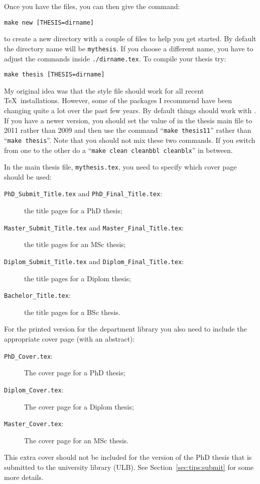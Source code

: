 \par\noindent
Once you have the files, you can then give the command:
\begin{verbatim}
make new [THESIS=dirname]
\end{verbatim}
to create a new directory with a couple of files to help you get
started. By default the directory name will be \texttt{mythesis}.
If you choose a different name, you have to adjust the 
commands inside \texttt{./dirname.tex}.
To compile your thesis try:
\begin{verbatim}
make thesis [THESIS=dirname]
\end{verbatim}

My original idea was that the style file should work for all recent
\TeX\ installations.  However, some of the packages I recommend have
been changing quite a lot over the past few years. By default things
should work with . If you
have a newer version, you should set the value of  in
the thesis main file to 2011 rather than
2009 and then use the command \enquote{\texttt{make thesis11}} rather
than \enquote{\texttt{make thesis}}. Note that you should not mix
these two commands. If you switch from one to the other do a
\enquote{\texttt{make clean cleanbbl cleanblx}} in between.

\noindent
In the main thesis file, \texttt{mythesis.tex}, you need to specify
which cover page should be used:
\begin{description}
\item[\texttt{PhD\_Submit\_Title.tex} and \texttt{PhD\_Final\_Title.tex}:]
  the title pages for a PhD thesis;
\item[\texttt{Master\_Submit\_Title.tex} and \texttt{Master\_Final\_Title.tex}:]
  the title pages for an MSc thesis;
\item[\texttt{Diplom\_Submit\_Title.tex} and \texttt{Diplom\_Final\_Title.tex}:]
  the title pages for a Diplom thesis;
\item[\texttt{Bachelor\_Title.tex}:]
  the title pages for a BSc thesis.
\end{description}
For the printed version for the department library you also need to
include the appropriate cover page (with an abstract):
\begin{description}
\item[\texttt{PhD\_Cover.tex}:]
  The cover page for a PhD thesis;
\item[\texttt{Diplom\_Cover.tex}:]
  The cover page for a Diplom thesis;
\item[\texttt{Master\_Cover.tex}:]
  The cover page for an MSc thesis.
\end{description}
This extra cover should not be included for the version of the PhD
thesis that is submitted to the university library (ULB). See
Section~\ref{sec:tips:submit} for some more details.

